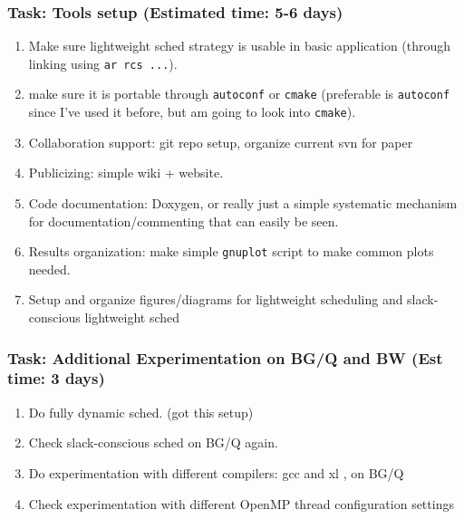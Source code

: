 \begin{frame} [Tasks] 
\frametitle{Task: Tools setup (Estimated time: 5-6 days)} 
\begin{enumerate} 
\item Make sure lightweight sched strategy is usable in 
basic application (through linking using \texttt{ar rcs ...}). \\ 
\item  make sure it is portable through \texttt{autoconf} or 
\texttt{cmake} (preferable is \texttt{autoconf} since I've used it 
before, but am going to look into \texttt{cmake}). \\ 
\item Collaboration support: git repo setup, organize current svn for paper \\ 
\item Publicizing: simple wiki + website.  \\ 
\item Code documentation: Doxygen, or really just a simple systematic mechanism for documentation/commenting that can easily be seen. \\ 
\item Results organization: make simple \texttt{gnuplot} script to make common plots needed. \\  
\item Setup and organize figures/diagrams for lightweight scheduling  and slack-conscious lightweight sched \\ 
\end{enumerate} 
\end{frame} 

\begin{frame} [Tasks] 
\frametitle{Task: Additional Experimentation on BG/Q and BW (Est time: 3 days)}
\begin{enumerate} 
\item Do fully dynamic sched. (got this setup) \\
\item Check slack-conscious sched on BG/Q again. \\ 
\item Do experimentation with different compilers: gcc and xl , on BG/Q  \\
\item Check experimentation with different OpenMP thread configuration settings \\ 
\end{enumerate}  
\end{frame} 

